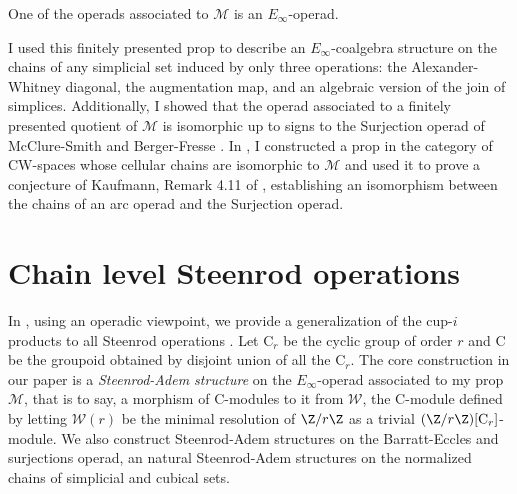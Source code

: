 \begin{theorem} 
	One of the operads associated to $\mathcal M$ is an $E_\infty$-operad.
\end{theorem}

I used this finitely presented prop to describe an $E_\infty$-coalgebra structure on the chains of any simplicial set induced by only three operations: the Alexander-Whitney diagonal, the augmentation map, and an algebraic version of the join of simplices.
Additionally, I showed that the operad associated to a finitely presented quotient of $\mathcal M$ is isomorphic up to signs to the Surjection operad of McClure-Smith \cite{mcclure2003multivariable} and Berger-Fresse \cite{berger2004combinatorial}.
In \cite{medina2018prop2}, I constructed a prop in the category of CW-spaces whose cellular chains are isomorphic to $\mathcal M$ and used it to prove a conjecture of Kaufmann, Remark 4.11 of \cite{kaufmann2009dimension}, establishing an isomorphism between the chains of an arc operad and the Surjection operad.

\section{Chain level Steenrod operations}
In \cite{medina2020maysteenrod}, using an operadic viewpoint, we provide a generalization of the cup-$i$ products to all Steenrod operations \cite{steenrod1962cohomology}.
Let $\mathrm C_r$ be the cyclic group of order $r$ and $\mathrm C$ be the groupoid obtained by disjoint union of all the $\mathrm C_r$.
The core construction in our paper is a \textit{Steenrod-Adem structure} on the $E_\infty$-operad associated to my prop $\mathcal M$, that is to say, a morphism of $\mathrm C$-modules to it from $\mathcal W$, the $\mathrm C$-module defined by letting $\mathcal W(r)$ be the minimal resolution of $\Z/r\Z$ as a trivial $(\Z/r\Z)[\mathrm C_r]$-module.
We also construct Steenrod-Adem structures on the Barratt-Eccles and surjections operad, an natural Steenrod-Adem structures on the normalized chains of simplicial and cubical sets.


